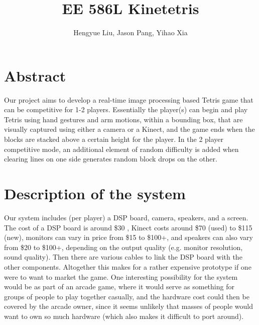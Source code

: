 \documentclass{article}
\title{EE 586L Kinetetris}
\author{Hengyue Liu, Jason Pang, Yihao Xia}
\begin{document}
	\maketitle
	
	
	\section{Abstract}
	Our project aims to develop a real-time image processing based Tetris game that can be competitive for 1-2 players. Essentially the player(s) can begin and play Tetris using hand gestures and arm motions, within a bounding box, that are visually captured using either a camera or a Kinect, and the game ends when the blocks are stacked above a certain height for the player. In the 2 player competitive mode, an additional element of random difficulty is added when clearing lines on one side generates random block drops on the other.
	
	\section{Description of the system}
	Our system includes (per player) a DSP board, camera, speakers, and a screen. The cost of a DSP board is around \$30 \cite{price}, Kinect costs around \$70 (used) to \$115 (new), monitors can vary in price from \$15 to \$100+, and speakers can also vary from \$20 to \$100+, depending on the output quality (e.g. monitor resolution, sound quality). Then there are various cables to link the DSP board with the other components. Altogether this makes for a rather expensive prototype if one were to want to market the game. One interesting possibility for the system would be as part of an arcade game, where it would serve as something for groups of people to play together casually, and the hardware cost could then be covered by the arcade owner, since it seems unlikely that masses of people would want to own so much hardware (which also makes it difficult to port around).\\
	
\end{document}
